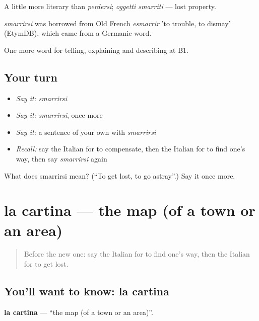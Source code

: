 A little more literary than \emph{perdersi}; \emph{oggetti smarriti} — lost property.

\begin{cousinweb}
\emph{smarrirsi} was borrowed from Old French \emph{esmarrir} 'to trouble, to dismay' (EtymDB), which came from a Germanic word.
\end{cousinweb}

\begin{grammarlens}[title={What you've built}]
One more word for telling, explaining and describing at B1.
\end{grammarlens}

\subsection*{Your turn}
\begin{itemize}
\raggedright
  \item \emph{Say it:} \emph{smarrirsi}
  \item \emph{Say it:} \emph{smarrirsi}, once more
  \item \emph{Say it:} a sentence of your own with \emph{smarrirsi}
  \item \emph{Recall:} say the Italian for to compensate, then the Italian for to find one's way, then say \emph{smarrirsi} again
\end{itemize}

\begin{tcolorbox}[breakable,colback=teal!4,colframe=teal!35!black,title={Before you move on}]
What does smarrirsi mean? (\textquotedblleft{}To get lost, to go astray\textquotedblright{}.) Say it once more.
\end{tcolorbox}
\section[la cartina]{la cartina — the map (of a town or an area)}

\label{lesson:IT-C439-cartina}



\begin{quote}
Before the new one: say the Italian for to find one's way, then the Italian for to get lost.
\end{quote}

\subsection*{You'll want to know: la cartina}
\textbf{la cartina} — \textquotedblleft{}the map (of a town or an area)\textquotedblright{}.

